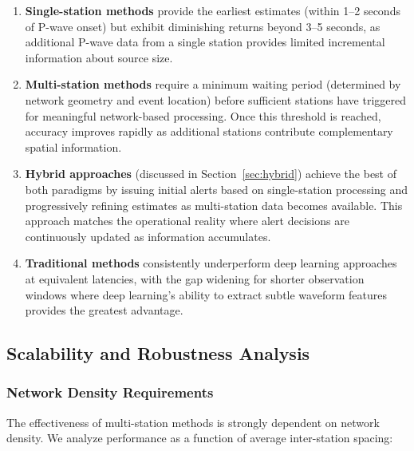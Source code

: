 \documentclass[review,authoryear]{elsarticle}
\begin{document}
\begin{enumerate}
\item \textbf{Single-station methods} provide the earliest estimates (within 1--2 seconds of P-wave onset) but exhibit diminishing returns beyond 3--5 seconds, as additional P-wave data from a single station provides limited incremental information about source size.

\item \textbf{Multi-station methods} require a minimum waiting period (determined by network geometry and event location) before sufficient stations have triggered for meaningful network-based processing. Once this threshold is reached, accuracy improves rapidly as additional stations contribute complementary spatial information.

\item \textbf{Hybrid approaches} (discussed in Section~\ref{sec:hybrid}) achieve the best of both paradigms by issuing initial alerts based on single-station processing and progressively refining estimates as multi-station data becomes available. This approach matches the operational reality where alert decisions are continuously updated as information accumulates.

\item \textbf{Traditional methods} consistently underperform deep learning approaches at equivalent latencies, with the gap widening for shorter observation windows where deep learning's ability to extract subtle waveform features provides the greatest advantage.
\end{enumerate}

\subsection{Scalability and Robustness Analysis}

\subsubsection{Network Density Requirements}

The effectiveness of multi-station methods is strongly dependent on network density. We analyze performance as a function of average inter-station spacing:
\end{document}
